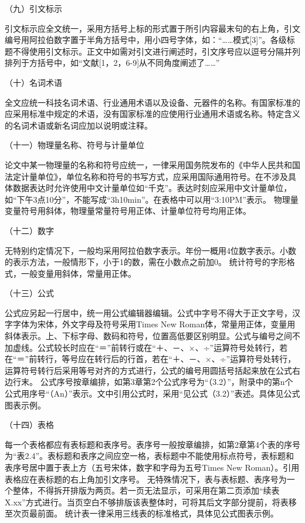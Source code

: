 （九）引文标示

引文标示应全文统一，采用方括号上标的形式置于所引内容最末句的右上角，引文编号用阿拉伯数字置于半角方括号中，用小四号字体，如：“……模式[3]”。各级标题不得使用引文标示。正文中如需对引文进行阐述时，引文序号应以逗号分隔并列排列于方括号中，如“文献[1，2，6-9]从不同角度阐述了……”

（十）名词术语

全文应统一科技名词术语、行业通用术语以及设备、元器件的名称。有国家标准的应采用标准中规定的术语，没有国家标准的应使用行业通用术语或名称。特定含义的名词术语或新名词应加以说明或注释。

（十一）物理量名称、符号与计量单位

论文中某一物理量的名称和符号应统一，一律采用国务院发布的《中华人民共和国法定计量单位》，单位名称和符号的书写方式，应采用国际通用符号。在不涉及具体数据表达时允许使用中文计量单位如“千克”。表达时刻应采用中文计量单位，如“下午3点10分”，不能写成“3h10min”。在表格中可以用“3:10PM”表示。
物理量变量符号用斜体，物理量常量符号用正体、计量单位符号均用正体。

（十二）数字

无特别约定情况下，一般均采用阿拉伯数字表示。年份一概用4位数字表示。小数的表示方法，一般情形下，小于1的数，需在小数点之前加0。
统计符号的字形格式，一般变量用斜体，常量用正体。

（十三）公式

公式应另起一行居中，统一用公式编辑器编辑。公式中字号不得大于正文字号，汉字字体为宋体，外文字母及符号采用Times New Roman体，常量用正体，变量用斜体表示。上、下标字母、数码和符号，位置高低要区别明显。公式与编号之间不加虚线。公式较长时应在“＝”前转行或在“＋、－、×、÷”运算符号处转行，若在“＝”前转行，等号应在转行后的行首，若在“＋、－、×、÷”运算符号处转行，运算符号转行后采用等号对齐的方式进行，公式的编号用圆括号括起来放在公式右边行末。
公式序号按章编排，如第3章第2个公式序号为“（3.2）”，附录中的第n个公式用序号“（An）”表示。文中引用公式时，采用“见公式（3.2）”表述。具体见公式图表示例。

（十四）表格

每一个表格都应有表标题和表序号。表序号一般按章编排，如第2章第4个表的序号为“表2.4”。表标题和表序之间应空一格，表标题中不能使用标点符号，表标题和表序号居中置于表上方（五号宋体，数字和字母为五号Times New Roman）。引用表格应在表标题的右上角加引文序号。
无特殊情况下，表与表标题、表序号为一个整体，不得拆开排版为两页。若一页无法显示，可采用在第二页添加“续表X.xx”方式进行。当页空白不够排版该表整体时，可将其后文字部分提前，将表移至次页最前面。
统计表一律采用三线表的标准格式，具体见公式图表示例。

